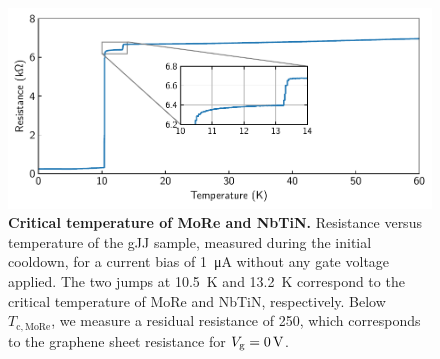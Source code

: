 \begin{figure}[]
	\centering
	\includegraphics[width=.7\linewidth]{chapter-gJJ/figs/si_cooldown_tc}
	\caption{{\bf Critical temperature of MoRe and NbTiN.}
		Resistance versus temperature of the gJJ sample, measured during the initial cooldown, for a current bias of \SI{1}{\micro A} without any gate voltage applied.
		The two jumps at \SI{10.5}{K} and \SI{13.2}{K} correspond to the critical temperature of MoRe and NbTiN, respectively.
		Below $T_\mathrm{c,MoRe}$, we measure a residual resistance of \SI{250}{\Omega}, which corresponds to the graphene sheet resistance for $V_{\rm g}=\SI{0}{V}$.}
	\label{fig:critical_temp}
\end{figure}


